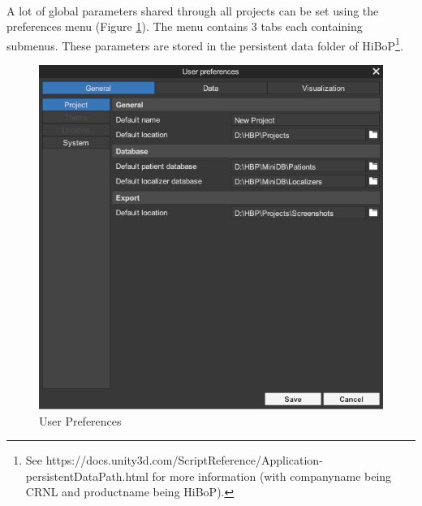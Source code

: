 \documentclass[a4paper]{article}
\begin{document}
\paragraph{} A lot of global parameters shared through all projects can be set using the preferences menu (Figure \ref{preferencesUI}). The menu contains 3 tabs each containing submenus. These parameters are stored in the persistent data folder of HiBoP\footnote{See https://docs.unity3d.com/ScriptReference/Application-persistentDataPath.html for more information (with companyname being CRNL and productname being HiBoP).}.
\begin{figure}[H]
\begin{center}
\includegraphics[scale=0.5]{Preferences.png}
\end{center}
\caption{\label{preferencesUI}User Preferences}
\end{figure}
\end{document}
